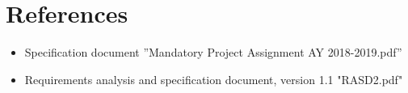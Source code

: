 \chapter{References}\label{c:ref}

\begin{itemize}
\item Specification document ”Mandatory Project Assignment AY 2018-2019.pdf”
\item Requirements analysis and specification document, version 1.1 "RASD2.pdf"
\end{itemize}
